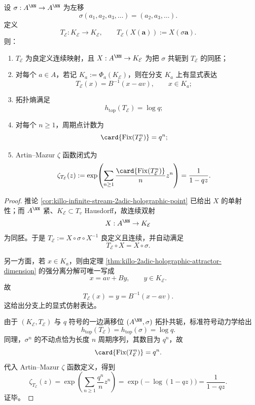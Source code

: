 \begin{theorem}\label{thm:killo-2adic-holographic-shift-dynamics}
设 \(\sigma:A^\NN\to A^\NN\) 为左移
\[
\sigma(a_1,a_2,a_3,\dots)=(a_2,a_3,\dots).
\]
定义
\[
T_{\mathcal E}:K_{\mathcal E}\to K_{\mathcal E},\qquad
T_{\mathcal E}(X(\mathbf a)):=X(\sigma\mathbf a).
\]
则：
\begin{enumerate}
  \item \(T_{\mathcal E}\) 为良定义连续映射，且 \(X:A^\NN\to K_{\mathcal E}\) 为把 \(\sigma\) 共轭到 \(T_{\mathcal E}\) 的同胚；
  \item 对每个 \(a\in A\)，若记 \(K_a:=\Phi_a(K_{\mathcal E})\)，则在分支 \(K_a\) 上有显式表达
  \[
  T_{\mathcal E}(x)=B^{-1}(x-av),\qquad x\in K_a;
  \]
  \item 拓扑熵满足
  \[
  h_{\mathrm{top}}(T_{\mathcal E})=\log q;
  \]
  \item 对每个 \(n\ge 1\)，周期点计数为
  \[
  \card{\mathrm{Fix}(T_{\mathcal E}^n)}=q^n;
  \]
  \item Artin--Mazur \(\zeta\) 函数闭式为
  \[
  \zeta_{T_{\mathcal E}}(z)
  :=
  \exp\!\left(\sum_{n\ge 1}\frac{\card{\mathrm{Fix}(T_{\mathcal E}^n)}}{n}z^n\right)
  =
  \frac{1}{1-qz}.
  \]
\end{enumerate}
\end{theorem}


\begin{proof}
推论 \ref{cor:killo-infinite-stream-2adic-holographic-point} 已给出 \(X\) 的单射性；而 \(A^\NN\) 紧、\(K_{\mathcal E}\subset T_v\) Hausdorff，故连续双射
\[
X:A^\NN\to K_{\mathcal E}
\]
为同胚。于是 \(T_{\mathcal E}:=X\circ \sigma\circ X^{-1}\) 良定义且连续，并自动满足
\[
T_{\mathcal E}\circ X=X\circ \sigma.
\]

另一方面，若 \(x\in K_a\)，则由定理 \ref{thm:killo-2adic-holographic-attractor-dimension} 的强分离分解可唯一写成
\[
x=av+By,\qquad y\in K_{\mathcal E}.
\]
故
\[
T_{\mathcal E}(x)=y=B^{-1}(x-av).
\]
这给出分支上的显式仿射表达。

由于 \((K_{\mathcal E},T_{\mathcal E})\) 与 \(q\) 符号的一边满移位 \((A^\NN,\sigma)\) 拓扑共轭，标准符号动力学给出
\[
h_{\mathrm{top}}(T_{\mathcal E})=h_{\mathrm{top}}(\sigma)=\log q.
\]
同理，\(\sigma^n\) 的不动点恰为长度 \(n\) 周期序列，其数目为 \(q^n\)，故
\[
\card{\mathrm{Fix}(T_{\mathcal E}^n)}=q^n.
\]
代入 Artin--Mazur \(\zeta\) 函数定义，得到
\[
\zeta_{T_{\mathcal E}}(z)
=
\exp\!\left(\sum_{n\ge 1}\frac{q^n}{n}z^n\right)
=
\exp\!\bigl(-\log(1-qz)\bigr)
=
\frac{1}{1-qz}.
\]
证毕。
\end{proof}

